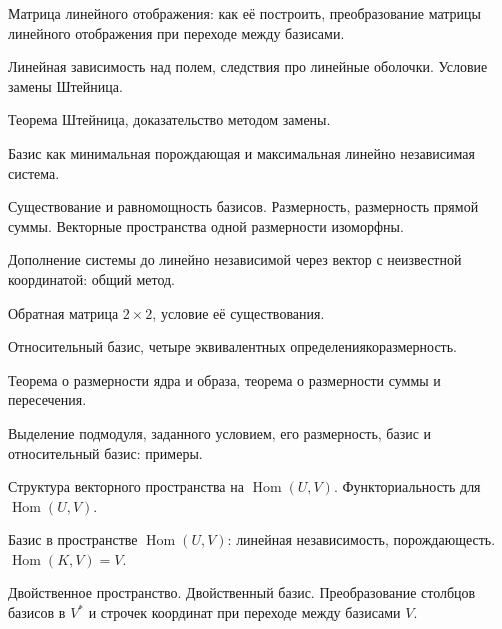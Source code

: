 \documentclass[a4paper]{extarticle}
\DeclareMathOperator{\Hom}{Hom}
\begin{document}
\begin{enumerate}
\itm Матрица линейного отображения: как её построить, преобразование матрицы линейного отображения при переходе между базисами.

\itm Линейная зависимость над полем, следствия про линейные оболочки. Условие замены Штейница.

\itm Теорема Штейница, доказательство методом замены.

\itm Базис как минимальная порождающая и максимальная линейно независимая система.

\itm Существование и равномощность базисов. Размерность, размерность прямой суммы. Векторные пространства одной размерности изоморфны.

\itm Дополнение системы до линейно независимой через вектор с неизвестной координатой: общий метод.

\itm Обратная матрица $2 \times 2$, условие её существования.

\itm Относительный базис, четыре эквивалентных определения\scolon коразмерность.

\itm Теорема о размерности ядра и образа, теорема о размерности суммы и пересечения.

\itm Выделение подмодуля, заданного условием, его размерность, базис и относительный базис: примеры.

\itm Структура векторного пространства на $\Hom (U,V)$. Функториальность для $\Hom(U,V)$.

\itm Базис в пространстве $\Hom(U,V)$: линейная независимость, порождающесть. $\Hom(K,V) = V$.

\itm Двойственное пространство. Двойственный базис. Преобразование столбцов базисов в $V^*$ и строчек координат при переходе между базисами $V$.




\end{enumerate}
\end{document}
